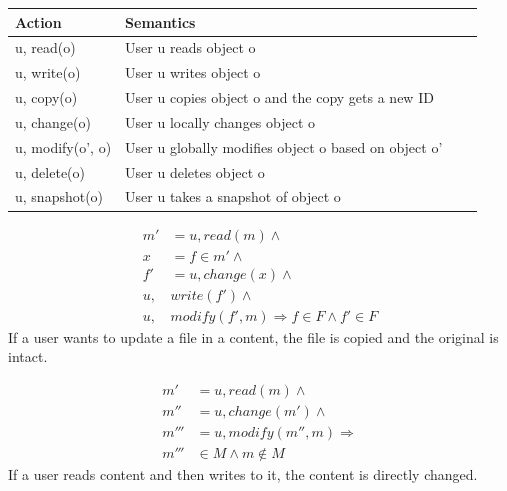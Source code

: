 \documentclass[a4paper,12pt]{article}
\newcommand{\Implies}{\Rightarrow}
\begin{document}
\begin{center}
    \begin{tabular}{ | l | l | l | p{5cm} |}
        \hline
        \textbf{Action} & \textbf{Semantics} \\ \hline
        u, read(o)            & User u reads object o\\ \hline
        u, write(o)           & User u writes object o\\ \hline
        u, copy(o)            & User u copies object o and the copy gets a new ID\\ \hline
        u, change(o)          & User u locally changes object o \\ \hline
        u, modify(o', o)      & User u globally modifies object o based on object o'\\ \hline
        u, delete(o)          & User u deletes object o\\ \hline
        u, snapshot(o)        & User u takes a snapshot of object o \\ \hline
    \end{tabular}
\end{center}

\begin{equation} \label{eq:fileupdate}
    \begin{split}
        m' & = u, read(m) \land \\
        x  & = f \in m' \land \\
        f' & = u, change(x) \land \\
        u, & write(f') \land \\
        u, & modify(f', m) \Implies f \in F \land f' \in F
    \end{split}
\end{equation}
If a user wants to update a file in a content, the file is copied and the original is intact.

\begin{equation} \label{eq:contentupdate}
    \begin{split}
        m' & = u, read(m) \land \\
        m'' & = u, change(m') \land \\
        m''' & = u, modify(m'', m) \Implies \\
        m''' & \in M \land m \not \in M
    \end{split}
\end{equation}
If a user reads content and then writes to it, the content is directly changed.
\end{document}

